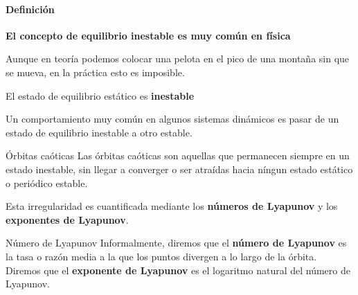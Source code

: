 \documentclass[8pt]{beamer}
\begin{document}
\begin{frame}
\framesubtitle{Definición}
\textbf{El concepto de equilibrio inestable es muy común en física}

\begin{example}
Aunque en teoría podemos colocar una pelota en el pico de una montaña sin que se mueva, en la práctica esto es imposible.

El estado de equilibrio estático es \textbf{inestable}
\end{example}

Un comportamiento muy común en algunos sistemas dinámicos es pasar de un estado de equilibrio inestable a otro estable.

\begin{block}{Órbitas caóticas}
Las órbitas caóticas son aquellas que permanecen siempre en un estado inestable, sin llegar a converger o ser atraídas hacia níngun estado estático o periódico estable.

Esta irregularidad es cuantificada mediante los \textbf{números de Lyapunov} y los \textbf{exponentes de Lyapunov}.
\end{block}

\begin{block}{Número de Lyapunov}
Informalmente, diremos que el \textbf{número de Lyapunov} es la tasa o razón media a la que los puntos divergen a lo largo de la órbita. Diremos que el \textbf{exponente de Lyapunov} es el logaritmo natural del número de Lyapunov.
\end{block}

\end{frame}
\end{document}
